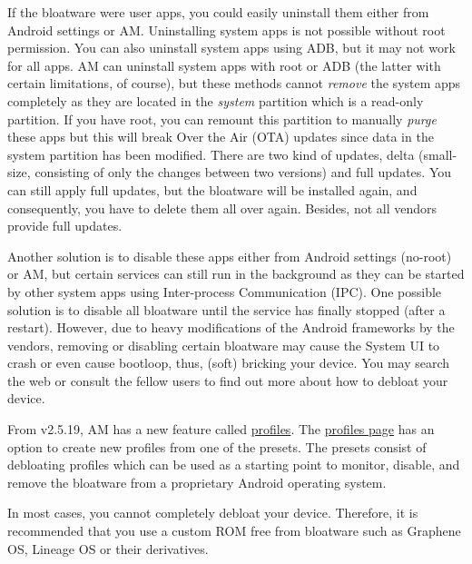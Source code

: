 If the bloatware were user apps, you could easily uninstall them either from Android settings or AM. Uninstalling system
apps is not possible without root permission. You can also uninstall system apps using ADB, but it may not work for all
apps. AM can uninstall system apps with root or ADB (the latter with certain limitations, of course), but these methods
cannot \emph{remove} the system apps completely as they are located in the \emph{system} partition which is a read-only
partition. If you have root, you can remount this partition to manually \emph{purge} these apps but this will break Over
the Air (OTA) updates since data in the system partition has been modified. There are two kind of updates, delta
(small-size, consisting of only the changes between two versions) and full updates. You can still apply full updates,
but the bloatware will be installed again, and consequently, you have to delete them all over again. Besides, not all
vendors provide full updates.

Another solution is to disable these apps either from Android settings (no-root) or AM, but certain services can still
run in the background as they can be started by other system apps using Inter-process Communication (IPC). One possible
solution is to disable all bloatware until the service has finally stopped (after a restart). However, due to heavy
modifications of the Android frameworks by the vendors, removing or disabling certain bloatware may cause the System UI
to crash or even cause bootloop, thus, (soft) bricking your device. You may search the web or consult the fellow users
to find out more about how to debloat your device.

From v2.5.19, AM has a new feature called \hyperref[sec:profile-page]{profiles}. The
\hyperref[sec:profiles-page]{profiles page} has an option to create new profiles from one of the presets. The presets
consist of debloating profiles which can be used as a starting point to monitor, disable, and remove the bloatware from
a proprietary Android operating system.

\begin{warning}[Note]
    In most cases, you cannot completely debloat your device. Therefore, it is recommended that you use a custom ROM
    free from bloatware such as Graphene OS, Lineage OS or their derivatives.
\end{warning}
